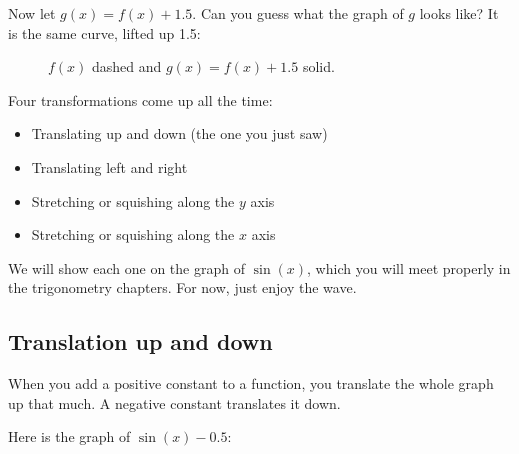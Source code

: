 Now let $g(x) = f(x) + 1.5$. Can you guess what the graph of $g$ looks
like? It is the same curve, lifted up 1.5:
\begin{figure}[H]
    \centering


    \caption{$f(x)$ dashed and $g(x) = f(x) + 1.5$ solid.}
    \label{fig:example-inverses_transformations}
\end{figure}


Four transformations come up all the
time:
\begin{itemize}
\item Translating up and down (the one you just saw)
\item Translating left and right
\item Stretching or squishing along the $y$ axis
\item Stretching or squishing along the $x$ axis
\end{itemize}

We will show each one on the graph of $\sin(x)$, which you will meet
properly in the trigonometry chapters. For now, just enjoy the wave.

\subsection{Translation up and down}

When you add a positive constant to a function, you translate the
whole graph up that much. A negative constant translates it down.

Here is the graph of $\sin(x) - 0.5$:


